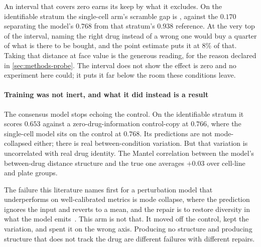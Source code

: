 An interval that covers zero earns its keep by what it excludes. On the
identifiable stratum the single-cell arm's scramble gap is
, against the $0.170$ separating the model's $0.768$
from that stratum's $0.938$ reference. At the very top of the interval, naming
the right drug instead of a wrong one would buy a quarter of what is there to be
bought, and the point estimate puts it at $8\%$ of that. Taking that distance at
face value is the generous reading, for the reason declared in
\cref{sec:methods-probe}. The interval does not show the effect is zero and no
experiment here could; it puts it far below the room these conditions leave.

\paragraph{Training was not inert, and what it did instead is a result} The
consensus model stops echoing the control. On the identifiable stratum it scores
$0.653$ against a zero-drug-information control-copy at $0.766$, where the
single-cell model sits on the control at $0.768$. Its predictions are not
mode-collapsed either; there is real between-condition variation. But that
variation is uncorrelated with real drug identity. The Mantel correlation between
the model's between-drug distance structure and the true one averages $+0.03$
over cell-line and plate groups.

The failure this literature names first for a perturbation model that
underperforms on well-calibrated metrics is mode collapse, where the prediction
ignores the input and reverts to a mean, and the repair is to restore diversity
in what the model emits~\cite{mejia}. This arm is not that. It moved off the control, kept the
variation, and spent it on the wrong axis. Producing no structure and producing
structure that does not track the drug are different failures with different
repairs.

